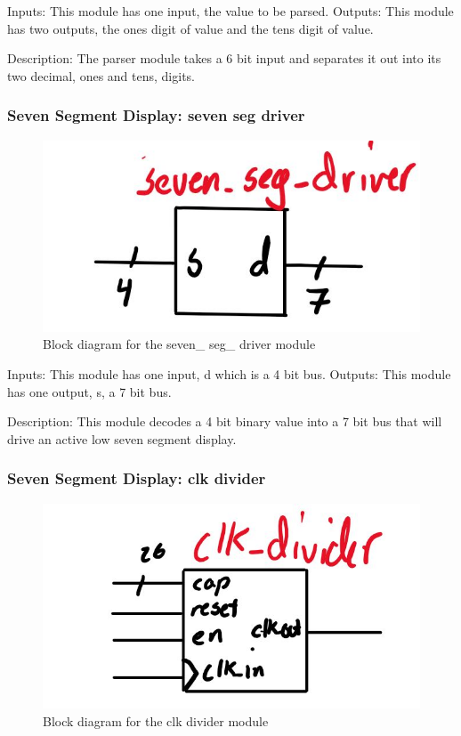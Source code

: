 \documentclass[a4paper]{article}
\begin{document}
Inputs: This module has one input, the value to be parsed.
Outputs: This module has two outputs, the ones digit of value and the tens digit of value.

Description: The parser module takes a 6 bit input and separates it out into its two decimal, ones and tens, digits.

\subsubsection{Seven Segment Display: seven seg driver}
\begin{figure}[H]
    \includegraphics[width=0.8 \linewidth]{images/sevensegdriver.JPG}
    \caption{Block diagram for the seven\_ seg\_ driver module}
    \label{sevensegdriver}
\end{figure}

Inputs: This module has one input, d which is a 4 bit bus.
Outputs: This module has one output, s, a 7 bit bus.

Description: This module decodes a 4 bit binary value into a 7 bit bus that will drive an active low seven segment display.

\subsubsection{Seven Segment Display: clk divider}
\begin{figure}[H]
    \includegraphics[width=0.8 \linewidth]{images/clkdivider.JPG}
    \caption{Block diagram for the clk divider module}
    \label{clkdriver}
\end{figure}
\end{document}
